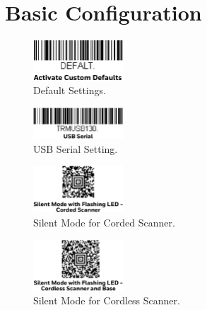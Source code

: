 \documentclass[11pt
  , a4paper
  , article
  , oneside
  , showtrims
]{memoir}
\begin{document}
\section{Basic Configuration}
\begin{figure}[!htb]
  \includegraphics[width=0.3\textwidth]{./pictures/scanner_settings_default.eps}
  \caption{
            Default Settings.
          }
  \label{fig:default}   
\end{figure}

\begin{figure}[!htb]
  \includegraphics[width=0.3\textwidth]{./pictures/scanner_settings_usbserial.eps}
  \caption{
            USB Serial Setting.
          }
  \label{fig:usb-serial}   
\end{figure}


\begin{figure}[!htb]
  \includegraphics[width=0.3\textwidth]{./pictures/scanner_settings_silent_corded.eps}
  \caption{
            Silent Mode for Corded Scanner.
          }
  \label{fig:silent-corded}   
\end{figure}



\begin{figure}[!htb]
  \includegraphics[width=0.3\textwidth]{./pictures/scanner_settings_silent_cordless.eps}
  \caption{
            Silent Mode for Cordless Scanner.
          }
  \label{fig:silent-cordless}   
\end{figure}


\newpage
\end{document}
